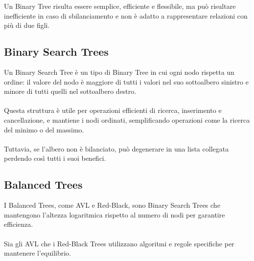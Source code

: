 \documentclass[12pt,a4paper,openright,twoside]{book}
\begin{document}
            Un Binary Tree risulta essere semplice, efficiente e flessibile, ma può risultare inefficiente in caso di sbilanciamento e non è adatto a rappresentare relazioni con più di due figli.

        \subsection{Binary Search Trees}

            Un Binary Search Tree è un tipo di Binary Tree in cui ogni nodo rispetta un ordine: il valore del nodo è maggiore di tutti i valori nel suo sottoalbero sinistro e minore di tutti quelli nel sottoalbero destro.

            \paragraph*{}

            Questa struttura è utile per operazioni efficienti di ricerca, inserimento e cancellazione, e mantiene i nodi ordinati, semplificando operazioni come la ricerca del minimo o del massimo.

            \paragraph*{}

            Tuttavia, se l'albero non è bilanciato, può degenerare in una lista collegata perdendo così tutti i suoi benefici.

        \subsection{Balanced Trees}
            I Balanced Trees, come AVL e Red-Black, sono Binary Search Trees che mantengono l'altezza logaritmica rispetto al numero di nodi per garantire efficienza.

            \paragraph*{}

            Sia gli AVL che i Red-Black Trees utilizzano algoritmi e regole specifiche per mantenere l'equilibrio.

            \paragraph*{}
\end{document}
